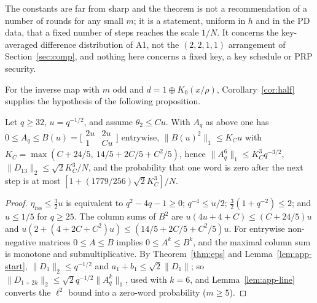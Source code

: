 The constants are far from sharp and the theorem is not a recommendation of a number of rounds for any small $m$; it is a statement,
uniform in $h$ and in the PD data, that a fixed number of steps reaches the scale $1/N$. It concerns the key-averaged difference
distribution of A1, not the $(2,2,1,1)$ arrangement of Section~\ref{sec:comp}, and nothing here concerns a fixed key, a key schedule or
PRP security.

For the inverse map with $m$ odd and $d=1\oplus K_0(x/\rho)$, Corollary~\ref{cor:half} supplies the hypothesis of the following proposition.

\begin{proposition}\label{prop:condsteps}
Let $q\ge32$, $u=q^{-1/2}$, and assume $\theta_2\le Cu$. With $A_q$ as above one has
$0\le A_q\le B(u)=\bigl[\begin{smallmatrix}2u&2u\\1&Cu\end{smallmatrix}\bigr]$ entrywise,
$\|B(u)^2\|_1\le K_Cu$ with $K_C=\max(C+24/5,\ 14/5+2C/5+C^2/5)$, hence $\|A_q^6\|_1\le K_C^3q^{-3/2}$,
$\|D_{13}\|_2\le\sqrt2K_C^3/N$, and the probability that one word is zero after the next step is at most
$[1+(1779/256)\sqrt2K_C^3]/N$.
\end{proposition}
\begin{proof}
$\eta_{\mathrm{rss}}\le\frac32u$ is equivalent to $q^2-4q-1\ge0$; $q^{-4}\le u/2$; $\frac32(1+q^{-2})\le2$; and $u\le1/5$ for $q\ge25$.
The column sums of $B^2$ are $u(4u+4+C)\le(C+24/5)u$ and $u(2+(4+2C+C^2)u)\le(14/5+2C/5+C^2/5)u$. For
entrywise non-negative matrices $0\le A\le B$ implies $0\le A^k\le B^k$, and the maximal column sum is monotone and
submultiplicative. By Theorem~\ref{thm:eps} and Lemma~\ref{lem:app-start}, $\|D_1\|_2\le q^{-1/2}$ and $a_1+b_1\le\sqrt2\|D_1\|$; so
$\|D_{1+2k}\|_2\le\sqrt2q^{-1/2}\|A_q^k\|_1$, used with $k=6$, and Lemma~\ref{lem:app-line} converts the $\ell^2$ bound into a zero-word
probability ($m\ge5$).
\end{proof}

